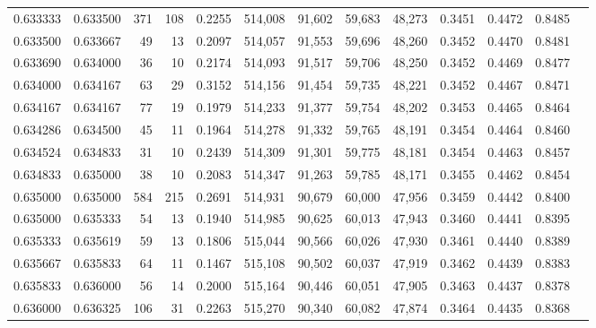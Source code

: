 \begin{tabular}{rrrrrrrrrrrrr}
0.633333 & 0.633500 &   371 & 108 &                                     0.2255 & 514,008 &  91,602 &  59,683 &  48,273 & 0.3451 & 0.4472 & 0.8485 \\
0.633500 & 0.633667 &    49 &  13 &                                     0.2097 & 514,057 &  91,553 &  59,696 &  48,260 & 0.3452 & 0.4470 & 0.8481 \\
0.633690 & 0.634000 &    36 &  10 &                                     0.2174 & 514,093 &  91,517 &  59,706 &  48,250 & 0.3452 & 0.4469 & 0.8477 \\
0.634000 & 0.634167 &    63 &  29 &                                     0.3152 & 514,156 &  91,454 &  59,735 &  48,221 & 0.3452 & 0.4467 & 0.8471 \\
0.634167 & 0.634167 &    77 &  19 &                                     0.1979 & 514,233 &  91,377 &  59,754 &  48,202 & 0.3453 & 0.4465 & 0.8464 \\
0.634286 & 0.634500 &    45 &  11 &                                     0.1964 & 514,278 &  91,332 &  59,765 &  48,191 & 0.3454 & 0.4464 & 0.8460 \\
0.634524 & 0.634833 &    31 &  10 &                                     0.2439 & 514,309 &  91,301 &  59,775 &  48,181 & 0.3454 & 0.4463 & 0.8457 \\
0.634833 & 0.635000 &    38 &  10 &                                     0.2083 & 514,347 &  91,263 &  59,785 &  48,171 & 0.3455 & 0.4462 & 0.8454 \\
0.635000 & 0.635000 &   584 & 215 &                                     0.2691 & 514,931 &  90,679 &  60,000 &  47,956 & 0.3459 & 0.4442 & 0.8400 \\
0.635000 & 0.635333 &    54 &  13 &                                     0.1940 & 514,985 &  90,625 &  60,013 &  47,943 & 0.3460 & 0.4441 & 0.8395 \\
0.635333 & 0.635619 &    59 &  13 &                                     0.1806 & 515,044 &  90,566 &  60,026 &  47,930 & 0.3461 & 0.4440 & 0.8389 \\
0.635667 & 0.635833 &    64 &  11 &                                     0.1467 & 515,108 &  90,502 &  60,037 &  47,919 & 0.3462 & 0.4439 & 0.8383 \\
0.635833 & 0.636000 &    56 &  14 &                                     0.2000 & 515,164 &  90,446 &  60,051 &  47,905 & 0.3463 & 0.4437 & 0.8378 \\
0.636000 & 0.636325 &   106 &  31 &                                     0.2263 & 515,270 &  90,340 &  60,082 &  47,874 & 0.3464 & 0.4435 & 0.8368 \\

\end{tabular}
